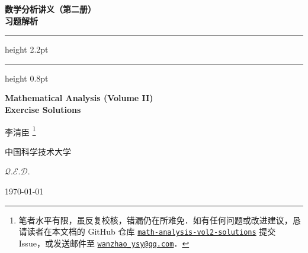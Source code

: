 \cleardoublepage
{}
{}
\thispagestyle{empty}

\begin{center}

    {\fontsize{34pt}{40pt}\selectfont\rmfamily\bfseries\color{ThemeWine}
        数学分析讲义（第二册）\\[0.4em] 习题解析
    }

    \vspace{1.2cm}

    {\color{ThemeWine}\hrule height 2.2pt}
    \vspace{2.5pt}
    {\color{ThemeRose}\hrule height 0.8pt}

    \vspace{1.2cm}

    {\fontsize{18pt}{22pt}\selectfont\rmfamily\bfseries\color{ThemeDarkBlue}
        Mathematical Analysis (Volume II)
    } \\
    \vspace{0.6em}
    {\large\rmfamily\bfseries\color{ThemeDarkBlue} Exercise Solutions}


    {\Large\kaishu\color{ThemeDarkBlue} 李清臣} \footnote{%
        \color{ThemeDarkBlue}\rmfamily
        笔者水平有限，虽反复校核，错漏仍在所难免．如有任何问题或改进建议，恳请读者在本文档的 GitHub 仓库
        \href{https://github.com/wanzhao-ysy/math-analysis-vol2-solutions}{\texttt{math-analysis-vol2-solutions}}
        提交 Issue，或发送邮件至 \href{mailto:wanzhao_ysy@qq.com}{\texttt{wanzhao\_ysy@qq.com}}．
    }

    \vspace{0.5cm}
    {\large\kaishu\color{ThemeMidBlue} 中国科学技术大学}

    \vspace{2cm}

    {\color{ThemeRose}\Large $\mathcal{Q.E.D.}$}

    \vspace{0.8cm}
    {\large\rmfamily\color{ThemeMidBlue}\today}

\end{center}

